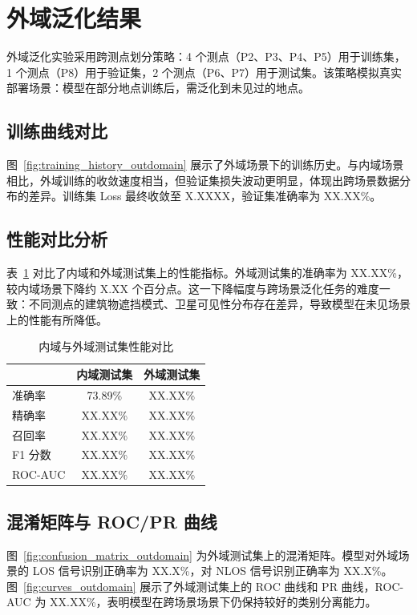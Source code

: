 \section{外域泛化结果}

外域泛化实验采用跨测点划分策略：4 个测点（P2、P3、P4、P5）用于训练集，1 个测点（P8）用于验证集，2 个测点（P6、P7）用于测试集。该策略模拟真实部署场景：模型在部分地点训练后，需泛化到未见过的地点。

\subsection{训练曲线对比}

图~\ref{fig:training_history_outdomain} 展示了外域场景下的训练历史。与内域场景相比，外域训练的收敛速度相当，但验证集损失波动更明显，体现出跨场景数据分布的差异。训练集 Loss 最终收敛至 X.XXXX，验证集准确率为 XX.XX\%。

\subsection{性能对比分析}

表~\ref{tab:metrics_outdomain} 对比了内域和外域测试集上的性能指标。外域测试集的准确率为 XX.XX\%，较内域场景下降约 X.XX 个百分点。这一下降幅度与跨场景泛化任务的难度一致：不同测点的建筑物遮挡模式、卫星可见性分布存在差异，导致模型在未见场景上的性能有所降低。

\begin{table}[h]
\centering
\caption{内域与外域测试集性能对比}
\label{tab:metrics_outdomain}
\begin{tabular}{lcc}
\hline
 & 内域测试集 & 外域测试集 \\
\hline
准确率 & 73.89\% & XX.XX\% \\
精确率 & XX.XX\% & XX.XX\% \\
召回率 & XX.XX\% & XX.XX\% \\
F1 分数 & XX.XX\% & XX.XX\% \\
ROC-AUC & XX.XX\% & XX.XX\% \\
\hline
\end{tabular}
\end{table}

\subsection{混淆矩阵与 ROC/PR 曲线}

图~\ref{fig:confusion_matrix_outdomain} 为外域测试集上的混淆矩阵。模型对外域场景的 LOS 信号识别正确率为 XX.X\%，对 NLOS 信号识别正确率为 XX.X\%。图~\ref{fig:curves_outdomain} 展示了外域测试集上的 ROC 曲线和 PR 曲线，ROC-AUC 为 XX.XX\%，表明模型在跨场景场景下仍保持较好的类别分离能力。

